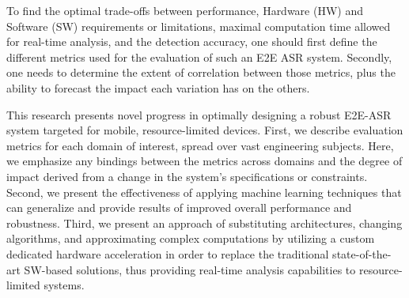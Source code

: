 To find the optimal trade-offs between performance,
Hardware (HW) and Software (SW) 
requirements or limitations, 
maximal computation time 
allowed for real-time analysis,
and the detection accuracy,
one should first define the different metrics 
used for the evaluation 
of such an E2E ASR system.
Secondly, one needs to determine 
the extent of correlation between those 
metrics, plus the ability to forecast the
impact each variation has on the others.

This research presents novel progress in optimally designing 
a robust E2E-ASR system
targeted for mobile, 
resource-limited devices. 
First, we describe evaluation metrics for each domain of interest, 
spread over vast engineering subjects. 
Here, we emphasize any bindings between the metrics 
across domains and the degree of impact 
derived from a change in the system's specifications or constraints. 
Second, we present the effectiveness
of applying machine learning techniques 
that can generalize and provide results 
of improved overall performance and robustness.
Third, we present an approach of substituting
architectures, changing algorithms,
and approximating complex computations
by utilizing 
a custom dedicated hardware acceleration 
in order to replace the 
traditional state-of-the-art SW-based 
solutions, thus providing real-time 
analysis capabilities to resource-limited systems.

